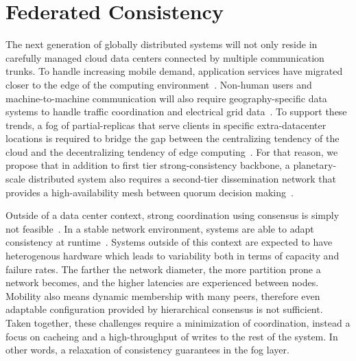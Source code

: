 
\renewcommand{\thechapter}{4}

\chapter{Federated Consistency}
\label{ch:federated_consistency}

The next generation of globally distributed systems will not only reside in carefully managed cloud data centers connected by multiple communication trunks.
To handle increasing mobile demand, application services have migrated closer to the edge of the computing environment~\cite{edge_computing}.
Non-human users and machine-to-machine communication will also require geography-specific data systems to handle traffic coordination and electrical grid data~\cite{cisco_internet_trends,sensor_networks,smart_grid,sotis,iot}.
To support these trends, a fog of partial-replicas that serve clients in specific extra-datacenter locations is required to bridge the gap between the centralizing tendency of the cloud and the decentralizing tendency of edge computing~\cite{fog,fog_mobile,fog_iot}.
For that reason, we propose that in addition to first tier strong-consistency backbone, a planetary-scale distributed system also requires a second-tier dissemination network that provides a high-availability mesh between quorum decision making~\cite{oceanstore}.

Outside of a data center context, strong coordination using consensus is simply not feasible~\cite{sensor_coordination}.
In a stable network environment, systems are able to adapt consistency at runtime~\cite{harmony,harmony_money,consistency_rationing,pitoura_data_1999,deno-toc}.
Systems outside of this context are expected to have heterogenous hardware which leads to variability both in terms of capacity and failure rates.
The farther the network diameter, the more partition prone a network becomes, and the higher latencies are experienced between nodes.
Mobility also means dynamic membership with many peers, therefore even adaptable configuration provided by hierarchical consensus is not sufficient.
Taken together, these challenges require a minimization of coordination, instead a focus on cacheing and a high-throughput of writes to the rest of the system.
In other words, a relaxation of consistency guarantees in the fog layer.

